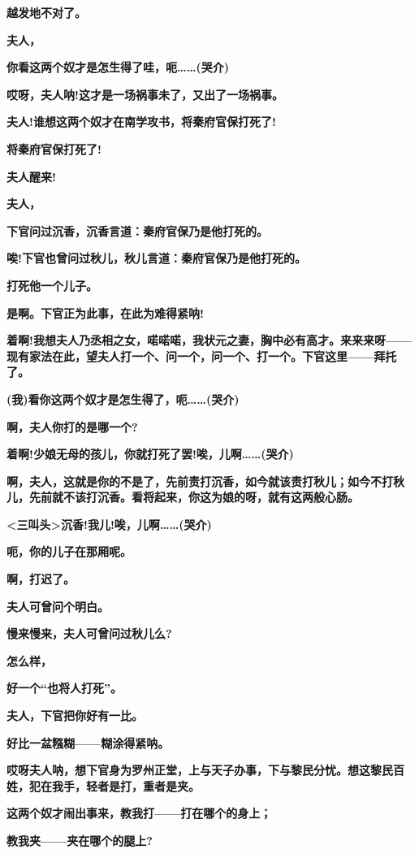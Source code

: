 \textbf{越发地不对了。}

\textbf{夫人，}

\textbf{你看这两个奴才是怎生得了哇，呃\ldots{}\ldots{}(哭介)}

\textbf{哎呀，夫人呐!这才是一场祸事未了，又出了一场祸事。}

\textbf{夫人!谁想这两个奴才在南学攻书，将秦府官保打死了!}

\textbf{将秦府官保打死了!}

\textbf{夫人醒来!}

\textbf{夫人，}

\textbf{下官问过沉香，沉香言道：秦府官保乃是他打死的。}

\textbf{唉!下官也曾问过秋儿，秋儿言道：秦府官保乃是他打死的。}

\textbf{打死他一个儿子。}

\textbf{是啊。下官正为此事，在此为难得紧呐!}

\textbf{着啊!我想夫人乃丞相之女，喏喏喏，我状元之妻，胸中必有高才。来来来呀------现有家法在此，望夫人打一个、问一个，问一个、打一个。下官这里------拜托了。}

\textbf{(我)看你这两个奴才是怎生得了，呃\ldots{}\ldots{}(哭介)}

\textbf{啊，夫人你打的是哪一个?}

\textbf{着啊!少娘无母的孩儿，你就打死了罢!唉，儿啊\ldots{}\ldots{}(哭介)}

\textbf{啊，夫人，这就是你的不是了，先前责打沉香，如今就该责打秋儿；如今不打秋儿，先前就不该打沉香。看将起来，你这为娘的呀，就有这两般心肠。}

\textbf{\textless{}三叫头\textgreater{}沉香!我儿!唉，儿啊\ldots{}\ldots{}(哭介)}

\textbf{呃，你的儿子在那厢呢。}

\textbf{啊，打迟了。}

\textbf{夫人可曾问个明白。}

\textbf{慢来慢来，夫人可曾问过秋儿么?}

\textbf{怎么样，}

\textbf{好一个``也将人打死''。}

\textbf{夫人，下官把你好有一比。}

\textbf{好比一盆糨糊------糊涂得紧呐。}

\textbf{哎呀夫人呐，想下官身为罗州正堂，上与天子办事，下与黎民分忧。想这黎民百姓，犯在我手，轻者是打，重者是夹。}

\textbf{这两个奴才闹出事来，教我打------打在哪个的身上；}

\textbf{教我夹------夹在哪个的腿上?}

